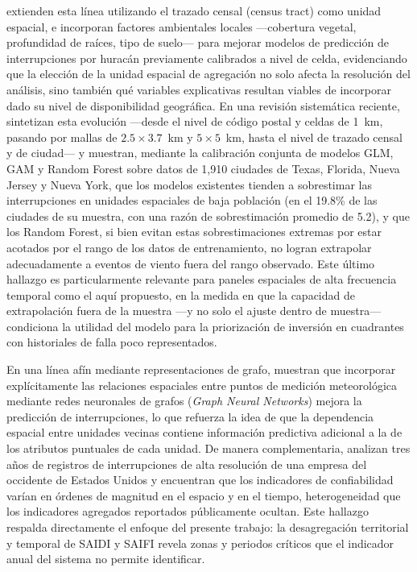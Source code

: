 \textcite{ref68mcroberts} extienden esta línea utilizando el trazado censal (census tract) como unidad espacial, e incorporan factores ambientales locales —cobertura vegetal, profundidad de raíces, tipo de suelo— para mejorar modelos de predicción de interrupciones por huracán previamente calibrados a nivel de celda, evidenciando que la elección de la unidad espacial de agregación no solo afecta la resolución del análisis, sino también qué variables explicativas resultan viables de incorporar dado su nivel de disponibilidad geográfica. En una revisión sistemática reciente, \textcite{ref43} sintetizan esta evolución —desde el nivel de código postal y celdas de 1~km, pasando por mallas de $2.5\times 3.7$~km y $5\times 5$~km, hasta el nivel de trazado censal y de ciudad— y muestran, mediante la calibración conjunta de modelos GLM, GAM y Random Forest sobre datos de 1{,}910 ciudades de Texas, Florida, Nueva Jersey y Nueva York, que los modelos existentes tienden a sobrestimar las interrupciones en unidades espaciales de baja población (en el 19.8\% de las ciudades de su muestra, con una razón de sobrestimación promedio de 5.2), y que los Random Forest, si bien evitan estas sobrestimaciones extremas por estar acotados por el rango de los datos de entrenamiento, no logran extrapolar adecuadamente a eventos de viento fuera del rango observado. Este último hallazgo es particularmente relevante para paneles espaciales de alta frecuencia temporal como el aquí propuesto, en la medida en que la capacidad de extrapolación fuera de la muestra —y no solo el ajuste dentro de muestra— condiciona la utilidad del modelo para la priorización de inversión en cuadrantes con historiales de falla poco representados.

En una línea afín mediante representaciones de grafo, \textcite{ref14} muestran que incorporar explícitamente las relaciones espaciales entre puntos de medición meteorológica mediante redes neuronales de grafos (\emph{Graph Neural Networks}) mejora la predicción de interrupciones, lo que refuerza la idea de que la dependencia espacial entre unidades vecinas contiene información predictiva adicional a la de los atributos puntuales de cada unidad. De manera complementaria, \textcite{ref8} analizan tres años de registros de interrupciones de alta resolución de una empresa del occidente de Estados Unidos y encuentran que los indicadores de confiabilidad varían en órdenes de magnitud en el espacio y en el tiempo, heterogeneidad que los indicadores agregados reportados públicamente ocultan. Este hallazgo respalda directamente el enfoque del presente trabajo: la desagregación territorial y temporal de SAIDI y SAIFI revela zonas y periodos críticos que el indicador anual del sistema no permite identificar.

